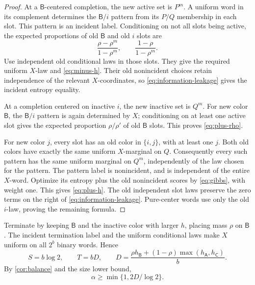 \documentclass[11pt]{article}
\numberwithin{equation}{section}
\theoremstyle{definition}
\theoremstyle{remark}
\begin{document}
\begin{proof}
At a \(\mathsf B\)-centered completion, the new active set is \(P^m\).
A uniform word in its complement determines the \(\mathsf B/i\) pattern
from its \(P/Q\) membership in each slot.
This pattern is an incident label.
Conditioning on not all slots being active, the expected proportions
of old \(\mathsf B\) and old \(i\) slots are
\[
 \frac{\rho-\rho^m}{1-\rho^m},
 \qquad \frac{1-\rho}{1-\rho^m}.
\]
Use independent old conditional laws in those slots.
They give the required uniform \(X\)-law and
\eqref{eq:minus-h}.
Their old nonincident choices retain independence of the relevant
\(X\)-coordinates, so \eqref{eq:information-leakage} gives the incident
entropy equality.

At a completion centered on inactive \(i\), the new inactive set is
\(Q^m\).  For new color \(\mathsf B\), the \(\mathsf B/i\) pattern is again
determined by \(X\); conditioning on at least one active slot gives
the expected proportion \(\rho/\rho'\) of old \(\mathsf B\) slots.
This proves \eqref{eq:plus-rho}.

For new color \(j\), every slot has an old color in \(\{i,j\}\), with
at least one \(j\).
Both old colors have exactly the same uniform \(X\)-marginal on \(Q\).
Consequently every such pattern has the same uniform marginal on
\(Q^m\), independently of the law chosen for the pattern.
The pattern label is nonincident, and is independent of the entire
\(X\)-word.
Optimize its entropy plus the old nonincident scores by
\eqref{eq:gibbs}, with weight one.
This gives \eqref{eq:plus-h}.
The old independent slot laws preserve the zero terms on the right
of \eqref{eq:information-leakage}.
Pure-center words use only the old \(i\)-law, proving the remaining
formula.
\end{proof}

Terminate by keeping \(\mathsf B\) and the inactive color with larger \(h\),
placing mass \(\rho\) on \(\mathsf B\).
The incident termination label and the uniform conditional laws make
\(X\) uniform on all \(2^b\) binary words.
Hence
\begin{equation}\label{eq:flat-rates}
 S=b\log2,\qquad
 T=bD,\qquad
 D=\frac{\rho h_{\mathsf B}+(1-\rho)\max(h_{\mathsf A},h_{\mathsf C})}{b}.
\end{equation}
By \cref{cor:balance} and the size lower bound,
\begin{equation}\label{eq:alpha-certificate}
 \alpha\ge \min\{1,2D/\log2\}.
\end{equation}
\end{document}
